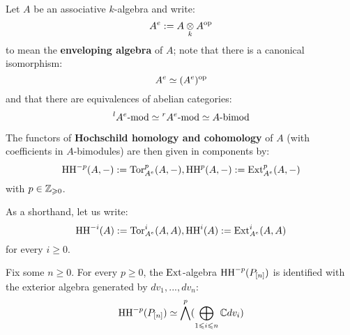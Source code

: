         \begin{definition} \label{def: hochschild_(co)homology}
            Let $A$ be an associative $k$-algebra and write:
                $$A^e := A \tensor_k A^{\op}$$
            to mean the \textbf{enveloping algebra} of $A$; note that there is a canonical isomorphism:
                $$A^e \simeq (A^e)^{\mathrm{op}}$$
            and that there are equivalences of abelian categories:
                $${}^lA^e\text{-}\mathrm{mod} \simeq {}^rA^e\text{-}\mathrm{mod} \simeq A\text{-}\mathrm{bimod}$$

            The functors of \textbf{Hochschild homology and cohomology} of $A$ (with coefficients in $A$-bimodules) are then given in components by:
                $$\mathrm{HH}^{-p}(A, -) := \mathrm{Tor}_{A^e}^p(A, -), \mathrm{HH}^p(A, -) := \mathrm{Ext}_{A^e}^p(A, -)$$
            with $p \in \mathbb{Z}_{\geqslant 0}$.
        \end{definition}
        \begin{convention}
            As a shorthand, let us write:
                $$\mathrm{HH}^{-i}(A) := \mathrm{Tor}_{A^e}^i(A, A), \mathrm{HH}^i(A) := \mathrm{Ext}_{A^e}^i(A, A)$$
            for every $i \geq 0$.
        \end{convention}
        \begin{lemma}
            Fix some $n \geq 0$. For every $p \geq 0$, the $\mathrm{Ext}$-algebra $\mathrm{HH}^{-p}(P_{[n]})$ is identified with the exterior algebra generated by $dv_1, ..., dv_n$:
                $$\mathrm{HH}^{-p}(P_{[n]}) \simeq \bigwedge^p ( \bigoplus_{1 \leqslant i \leqslant n} \mathbb{C} dv_i )$$
        \end{lemma}
        \begin{proposition}
            
        \end{proposition}

